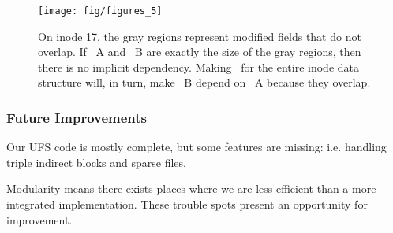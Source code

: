 \begin{figure}[htb]
  \centering
  \texttt{[image: fig/figures\_5]}
  \caption{\label{fig:overlap} On inode 17, the gray regions represent
  modified fields that do not overlap. If \chdesc\ A and \chdesc\ B are exactly
  the size of the gray regions, then there is no implicit dependency.
  Making \chdescs\ for the entire inode data structure will, in turn, make
  \chdesc\ B depend on \chdesc\ A because they overlap.}
\end{figure}

\subsubsection {Future Improvements}
Our UFS code is mostly complete, but some features are missing:
i.e. handling triple indirect blocks and sparse files.

Modularity means there exists places where we are less efficient
than a more integrated implementation. These trouble spots present
an opportunity for improvement.

